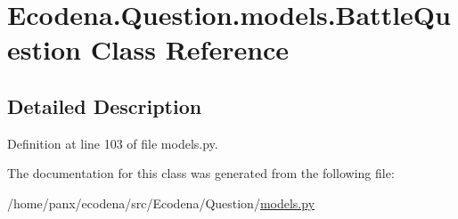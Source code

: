 \hypertarget{class_ecodena_1_1_question_1_1models_1_1_battle_question}{
\section{Ecodena.Question.models.BattleQuestion Class Reference}
\label{d8/d19/class_ecodena_1_1_question_1_1models_1_1_battle_question}
}


\subsection{Detailed Description}


Definition at line 103 of file models.py.



The documentation for this class was generated from the following file:\begin{DoxyCompactItemize}
\item 
/home/panx/ecodena/src/Ecodena/Question/\hyperlink{_question_2models_8py}{models.py}\end{DoxyCompactItemize}
